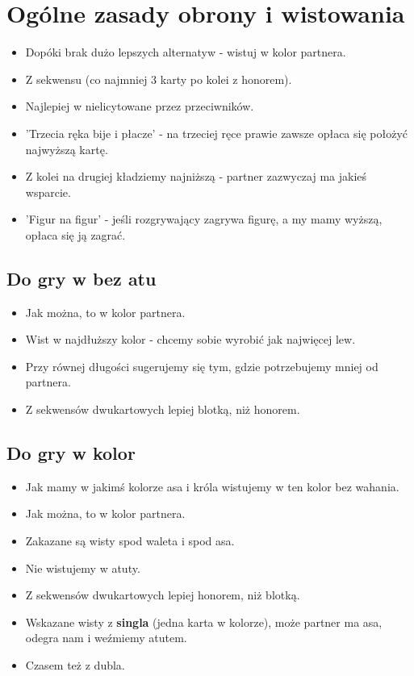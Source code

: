 \documentclass{article}
\begin{document}
\section*{Ogólne zasady obrony i wistowania}
\begin{itemize}
	\item Dopóki brak dużo lepszych alternatyw - wistuj w kolor partnera.
	\item Z sekwensu (co najmniej 3 karty po kolei z honorem).
	\item Najlepiej w nielicytowane przez przeciwników.
	\item 'Trzecia ręka bije i płacze' - na trzeciej ręce prawie zawsze opłaca się położyć najwyższą kartę.
	\item Z kolei na drugiej kładziemy najniższą - partner zazwyczaj ma jakieś wsparcie.
	\item 'Figur na figur' - jeśli rozgrywający zagrywa figurę, a my mamy wyższą, opłaca się ją zagrać.
\end{itemize}
\subsection*{Do gry w bez atu}
\begin{itemize}
	\item Jak można, to w kolor partnera.
	\item Wist w najdłuższy kolor - chcemy sobie wyrobić jak najwięcej lew.
	\item Przy równej długości sugerujemy się tym, gdzie potrzebujemy mniej od partnera.
	\item Z sekwensów dwukartowych lepiej blotką, niż honorem.
\end{itemize}
\subsection*{Do gry w kolor}
\begin{itemize}
	\item Jak mamy w jakimś kolorze asa i króla wistujemy w ten kolor bez wahania.
	\item Jak można, to w kolor partnera.
	\item Zakazane są wisty spod waleta i spod asa.
	\item Nie wistujemy w atuty.
	\item Z sekwensów dwukartowych lepiej honorem, niż blotką.
	\item Wskazane wisty z \textbf{singla} (jedna karta w kolorze), może partner ma asa, odegra nam i weźmiemy atutem.
	\item Czasem też z dubla.
\end{itemize}
\newpage
\end{document}
